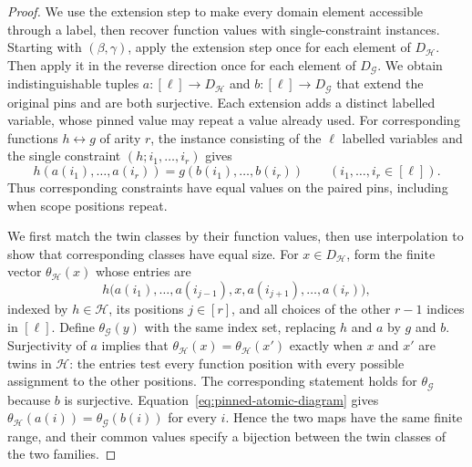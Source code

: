 \documentclass[11pt,letterpaper,onecolumn]{article}
\theoremstyle{plain}
\theoremstyle{definition}
\theoremstyle{remark}
\begin{document}
\begin{proof}
We use the extension step to make every domain element accessible through
a label, then recover function values with single-constraint instances.
Starting with $(\beta,\gamma)$, apply the extension step once for each
element of $D_{\mathcal H}$.  Then apply it in the reverse direction once for each
element of $D_{\mathcal G}$.  We obtain indistinguishable tuples
$a:[\ell]\to D_{\mathcal H}$ and $b:[\ell]\to D_{\mathcal G}$ that extend the original pins and
are both surjective.  Each extension adds a distinct labelled variable,
whose pinned value may repeat a value already used.
For corresponding functions $h\leftrightarrow g$ of arity $r$, the
instance consisting of the $\ell$ labelled variables and the single
constraint $(h;i_1,\ldots,i_r)$ gives
\begin{equation}
  h(a(i_1),\ldots,a(i_r))
  =g(b(i_1),\ldots,b(i_r))
  \qquad(i_1,\ldots,i_r\in[\ell]).
  \label{eq:pinned-atomic-diagram}
\end{equation}
Thus corresponding constraints have equal values on the paired pins,
including when scope positions repeat.

We first match the twin classes by their function values, then use
interpolation to show that corresponding classes have equal size.
For $x\in D_{\mathcal H}$, form the finite vector $\theta_{\mathcal H}(x)$ whose entries are
\[
  h\bigl(a(i_1),\ldots,a(i_{j-1}),x,
          a(i_{j+1}),\ldots,a(i_r)\bigr),
\]
indexed by $h\in\mathcal H$, its positions $j\in[r]$, and all choices
of the other $r-1$ indices in $[\ell]$.  Define $\theta_{\mathcal G}(y)$ with the
same index set, replacing $h$ and $a$ by $g$ and $b$.
Surjectivity of $a$ implies that
$\theta_{\mathcal H}(x)=\theta_{\mathcal H}(x')$ exactly when $x$ and $x'$ are twins in
$\mathcal H$: the entries test every function position with every
possible assignment to the other positions.  The corresponding statement
holds for $\theta_{\mathcal G}$ because $b$ is surjective.
Equation~\eqref{eq:pinned-atomic-diagram} gives
$\theta_{\mathcal H}(a(i))=\theta_{\mathcal G}(b(i))$ for every $i$.  Hence the two maps
have the same finite range, and their common values specify a bijection
between the twin classes of the two families.


\end{proof}
\end{document}
